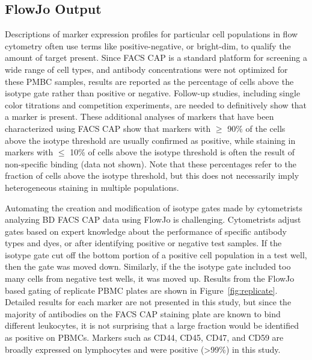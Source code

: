 \documentclass[12pt]{article}
\begin{document}
\subsection*{FlowJo Output}

Descriptions of marker expression profiles for particular cell populations in
flow cytometry often use terms like positive-negative, or bright-dim, to
qualify the amount of target present. Since FACS CAP is a
standard platform for screening a wide range of cell types, and antibody
concentrations were not optimized for these PMBC samples, results are reported as
the percentage of cells above the isotype gate rather than positive or
negative. Follow-up studies, including single color titrations and competition
experiments, are needed to definitively show that a marker is present.
These additional analyses of markers that have been characterized
using FACS CAP show that markers with $\ge$ 90\% of the cells above the isotype
threshold are usually confirmed as positive, while staining in markers with
$\le$ 10\% of cells above the isotype threshold is often the result of
non-specific binding (data not shown). Note that these percentages refer to the
fraction of cells above the isotype threshold, but this does not necessarily
imply heterogeneous staining in multiple populations.

Automating the creation and modification of isotype gates made by cytometrists
analyzing BD FACS CAP data using FlowJo is challenging. Cytometrists adjust
gates based on expert knowledge about the performance of specific antibody
types and dyes, or after identifying positive or negative test samples. If the
isotype gate cut off the bottom portion of a positive cell population in a test
well, then the gate was moved down.  Similarly, if the the isotype gate
included too many cells from negative test wells, it was moved up. Results from
the FlowJo based gating of replicate PBMC plates are shown in
Figure~\ref{fig:replicate}. Detailed results for each marker are not
presented in this study, but since the majority of antibodies on the FACS
CAP staining plate are known to bind different leukocytes, it is not surprising
that a large fraction would be identified as positive on PBMCs. Markers such as
CD44, CD45, CD47, and CD59 are broadly expressed on lymphocytes and were
positive (>99\%) in this study.

\end{document}
